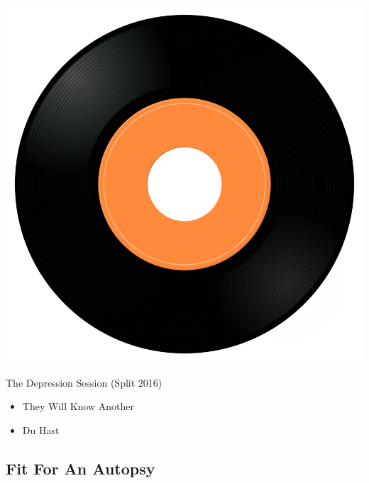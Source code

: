 \begin{minipage}[t]{0.25\textwidth}\vspace{0pt}
\captionsetup{type=figure}
\includegraphics[width=\textwidth]{Images/cover.png}
\caption*{The Depression Session (Split 2016)}
\end{minipage}
\begin{minipage}[t]{0.25\textwidth}\vspace{0pt}
\begin{itemize}[nosep,leftmargin=1em,labelwidth=*,align=left]
	\setlength{\itemsep}{0pt}
	\item They Will Know Another
	\item Du Hast
\end{itemize}
\end{minipage}

\subsection{Fit For An Autopsy}

